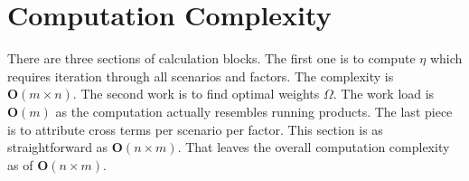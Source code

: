 \documentclass{article}
\begin{document}
\section{Computation Complexity}
There are three sections of calculation blocks. The first one is to compute $ \eta $ which requires iteration through all scenarios and factors. The complexity is $ \boldsymbol{O}(m \times n) $. The second work is to find optimal weights $ \Omega $. The work load is $ \boldsymbol{O}(m) $ as the computation actually resembles running products. The last piece is to attribute cross terms per scenario per factor. This section is as straightforward as $ \boldsymbol{O}(n \times m) $. That leaves the overall computation complexity as of $ \boldsymbol{O}(n \times m) $.
\end{document}
